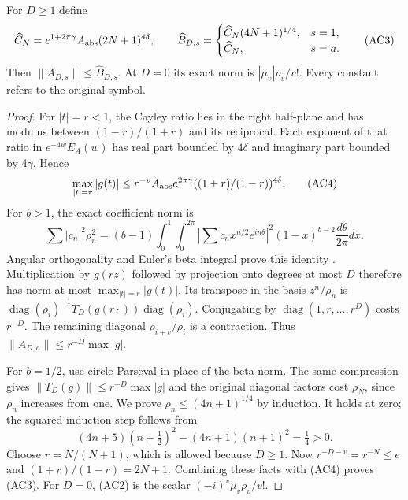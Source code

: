\begin{proposition}
For $D\ge1$ define
\[
 \widehat C_N=e^{1+2\pi\gamma} A_{\rm abs}(2N+1)^{4\delta},\qquad
 \widehat B_{D,s}=
 \begin{cases}\widehat C_N(4N+1)^{1/4},&s=1,\\
 \widehat C_N,&s=a.
 \end{cases}\tag{AC3}
\]
Then $\|A_{D,s}\|\le\widehat B_{D,s}$. At $D=0$ its exact norm is
$|\mu_v|\rho_v/v!$. Every constant refers to the original symbol.
\end{proposition}
\begin{proof}
For $|t|=r<1$, the Cayley ratio lies in the right half-plane and has
modulus between $(1-r)/(1+r)$ and its reciprocal. Each exponent of that
ratio in $e^{-4w}E_A(w)$ has real part bounded by $4\delta$ and
imaginary part bounded by $4\gamma$. Hence
\[
 \max_{|t|=r}|g(t)|\le
 r^{-v} A_{\rm abs}e^{2\pi\gamma}
 ((1+r)/(1-r))^{4\delta}.\tag{AC4}
\]
For $b>1$, the exact coefficient norm is
\[
 \sum|c_n|^2\rho_n^2=(b-1)\int_0^1\int_0^{2\pi}
 |\sum c_n x^{n/2}e^{in\theta}|^2(1-x)^{b-2}
 \frac{d\theta}{2\pi}dx.
\]
Angular orthogonality and Euler's beta integral prove this identity
\cite[5.12.1]{DLMF5}. Multiplication by $g(rz)$ followed by projection
onto degrees at most $D$ therefore has norm at most $\max_{|t|=r}|g(t)|$.
Its transpose in the basis $z^n/\rho_n$ is
$\operatorname{diag}(\rho_i)^{-1}T_D(g(r\cdot))
\operatorname{diag}(\rho_i)$. Conjugating by
$\operatorname{diag}(1,r,\ldots,r^D)$ costs $r^{-D}$.
The remaining diagonal $\rho_{i+v}/\rho_i$ is a contraction. Thus
$\|A_{D,a}\|\le r^{-D}\max|g|$.

For $b=1/2$, use circle Parseval in place of the beta norm. The same
compression gives $\|T_D(g)\|\le r^{-D}\max|g|$ and the original
diagonal factors cost $\rho_N$, since $\rho_n$ increases from one.
We prove $\rho_n\le(4n+1)^{1/4}$ by induction. It holds at zero;
the squared induction step follows from
\[
 (4n+5)(n+\tfrac12)^2-(4n+1)(n+1)^2=\tfrac14>0.
\]
Choose $r=N/(N+1)$, which is allowed because $D\ge1$. Now
$r^{-D-v}=r^{-N}\le e$ and $(1+r)/(1-r)=2N+1$.
Combining these facts with (AC4) proves (AC3). For $D=0$, (AC2) is
the scalar $(-i)^v\mu_v\rho_v/v!$.
\end{proof}

